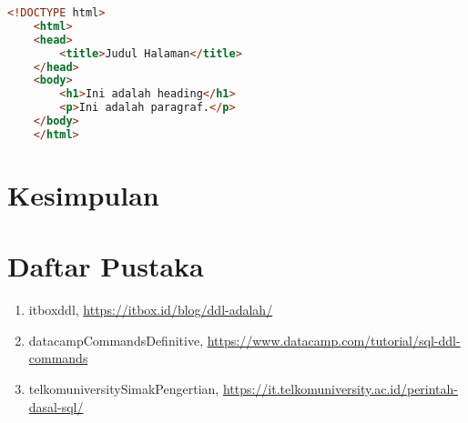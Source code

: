 \documentclass[a4paper,oneside,11pt]{book}
\begin{document}
\begin{lstlisting}[language=HTML, style=htmlstyle]
    <!DOCTYPE html>
    <html>
    <head>
        <title>Judul Halaman</title>
    </head>
    <body>
        <h1>Ini adalah heading</h1>
        <p>Ini adalah paragraf.</p>
    </body>
    </html>
\end{lstlisting}


\chapter{Kesimpulan}

\chapter{Daftar Pustaka}
\begin{enumerate}
    \item itboxddl, \url{https://itbox.id/blog/ddl-adalah/}
    \item datacampCommandsDefinitive, \url{https://www.datacamp.com/tutorial/sql-ddl-commands}
    \item telkomuniversitySimakPengertian, \url{https://it.telkomuniversity.ac.id/perintah-dasal-sql/}
\end{enumerate}
\end{document}

